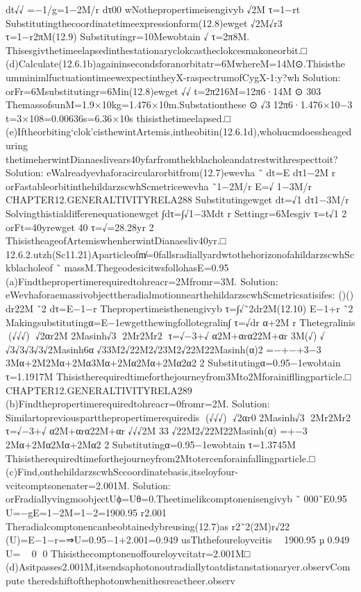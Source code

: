 {{{{{{{{{{{{{{{{dt√√
=−1/g=1−2M/r
dτ00
wNothepropertimeisengivyb
√2M
τ=1−rt
Substitutingthecoordinatetimeexpressionform(12.8)ewget
√2M√r3
τ=1−r2πM(12.9)
Substitutingr=10Mewobtain
√
τ=2π8M.
Thisesgivthetimeelapsedinthestationaryclokcastheclokcesmakoneorbit.□
(d)Calculate(12.6.1b)againinsecondsforanorbitatr=6MwhereM=14M⊙.Thisisthe
umminimlfuctuationtimeewexpectintheyX-raspectrumofCygX-1:y?wh
Solution:
orFr=6Msubstitutingr=6Min(12.8)ewget
√√
t=2π216M=12π6·14M
⊙
303
ThemassofsunM=1.9×10kg=1.476×10m.Substationthese
⊙
√3
12π6·1.476×10−3
t=3×108=0.00636s=6.36×10s
thisisthetimeelapsed.□
(e)Iftheorbiting‘clok’cisthewintArtemis,intheobitin(12.6.1d),whohucmdoessheageduring
thetimeherwintDianaeslivears40yfarfromthekblacholeandatrestwithrespecttoit?
Solution:
eWalreadyevhaforacircularorbitfrom(12.7)ewevha
˜
dt=E
dτ1−2M
r
orFastableorbitinthehildarzscwhScmetricewevha
˜1−2M/r
E=√
1−3M/r
CHAPTER12.GENERALTIVITYRELA288
Substitutingewget
dt=√1
dτ1−3M/r
Solvingthistialdifferenequationewget
∫dτ=∫√1−3Mdt
r
Settingr=6Mesgiv
τ=t√1
2
orFt=40yrewget
40
τ=√=28.28yr
2
ThisistheageofArtemiswhenherwintDianaesliv40yr.□
12.6.2.utzh(Sc11.21)Aparticleofm̸=0fallsradiallyardwtothehorizonofahildarzscwhSckblacholeof
˜
massM.ThegeodesicitwsfollohasE=0.95
(a)Findthepropertimerequiredtohreacr=2Mfromr=3M.
Solution:
eWevhaforaemassivobjecttheradialmotionnearthehildarzscwhScmetricsatisifes:
()()
dr22M
˜2
dτ=E−1−r
Thepropertimeisthenengivyb
τ=∫√˜2dr2M(12.10)
E−1+r
˜2
Makingsubstitutingα=E−1ewgetthewingfollotegralin∫
τ=√dr
α+2M
r
Thetegralinis
(√√√)
√2αr2M
2Masinh√3
2Mr2Mr2
τ=√−3+√
α2M+αrα22M+αr
3M(√)
√
√3√3√3√3√2Masinh6α
√33M2√22M2√23M2√22M22Masinh(α)2
=−+−+3−3
3Mα+2M2Mα+2Mα3Mα+2Mα2Mα+2Mα2α2
2
Substitutingα=0.95−1ewobtain
τ=1.1917M
Thisistherequiredtimeforthejourneyfrom3Mto2Mforainifllingparticle.□
CHAPTER12.GENERALTIVITYRELA289
(b)Findthepropertimerequiredtohreacr=0fromr=2M.
Solution:
Similartopreviouspartthepropertimerequiredis
(√√√)
√2αr0
2Masinh√3
2Mr2Mr2
τ=√−3+√
α2M+αrα22M+αr
√√√2M
33
√22M2√22M22Masinh(α)
=+−3
2Mα+2Mα2Mα+2Mα2
2
Substitutingα=0.95−1ewobtain
τ=1.3745M
Thisistherequiredtimeforthejourneyfrom2Mtotercenforainfallingparticle.□
(c)Find,onthehildarzscwhSccoordinatebasis,itseloyfour-vcitcomptsonenater=2.001M.
Solution:
orFradiallyvingmoobjectUϕ=Uθ=0.Theetimelikcomptonenisengivyb
˜
000˜E0.95
U=−gE=1−2M=1−2=1900.95
r2.001
Theradialcomptonencanbeobtainedybreusing(12.7)as
r2˜2(2M)r√22
(U)=E−1−r=⇒U=0.95−1+2.001=0.949
usThthefoureloyvcitis

1900.95
µ0.949
U=
0
0
Thisisthecomptonenoffoureloyvcitatr=2.001M□
(d)Asitpasses2.001M,itsendsaphotonoutradiallytoatdistanstationaryer.observCompute
theredshiftofthephotonwhenithesreactheer.observ
}}}}}}}}}}}}}}}}
